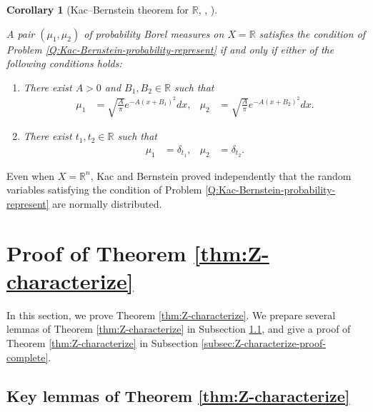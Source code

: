 \documentclass[12pt]{article}
\newtheorem{corollary}[theorem]{Corollary}
\theoremstyle{definition}
\theoremstyle{remark}
\numberwithin{equation}{section}
\numberwithin{figure}{section}
\numberwithin{table}{section}
\begin{document}
\begin{corollary}[Kac--Bernstein theorem for $ \mathbb{ R } $, {\cite{MR371}, \cite{bernstein1941property}}]
    \label{cor:original-Kac-Bernstein}

A pair $ ( \mu_1 , \mu_2 ) $ of probability Borel measures on $ X = \mathbb{ R } $ satisfies the condition of Problem \ref{Q:Kac-Bernstein-probability-represent} if and only if either of the following conditions holds:

\begin{enumerate}

\item \label{item:original-Kac-Bernstein-R-Gauss}

There exist $ A > 0 $ and $ B_1 , B_2 \in \mathbb{ R } $ such that
\begin{align}
  \mu_1 & = \sqrt{ \frac{ A }{ \pi } } e^{ - A ( x + B_1 )^2 } dx, &
  \mu_2 & = \sqrt{ \frac{ A }{ \pi } } e^{ - A ( x + B_2 )^2 } dx.
\end{align}

\item \label{item:original-Kac-Bernstein-degenerate}

There exist $ t_1 , t_2 \in \mathbb{ R } $ such that
\begin{align}
  \mu_1 & = \delta_{ t_1 }, &
  \mu_2 & = \delta_{ t_2 }.
\end{align}

\end{enumerate}

\end{corollary}

Even when $ X = \mathbb{ R }^n $, Kac and Bernstein proved independently that the random variables satisfying the condition of Problem \ref{Q:Kac-Bernstein-probability-represent} are normally distributed.

\section{Proof of Theorem \ref{thm:Z-characterize}}
\label{sec:Z-characterize-proof}

In this section, we prove Theorem \ref{thm:Z-characterize}.
We prepare several lemmas of Theorem \ref{thm:Z-characterize} in Subsection \ref{subsec:Z-characterize-proof-lemma}, and give a proof of Theorem \ref{thm:Z-characterize} in Subsection \ref{subsec:Z-characterize-proof-complete}.

\subsection{Key lemmas of Theorem \ref{thm:Z-characterize}}
\label{subsec:Z-characterize-proof-lemma}
\end{document}
